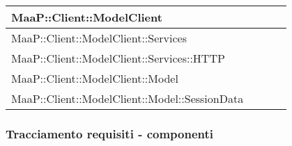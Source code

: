 \begin{center}
\begin{longtable}{|p{0.8\linewidth}|c|}
\midrule 
MaaP::Client::ModelClient
& \\

\midrule 
MaaP::Client::ModelClient::Services
& \\

\midrule 
MaaP::Client::ModelClient::Services::HTTP
& \\

\midrule 
MaaP::Client::ModelClient::Model
& \\

\midrule 
MaaP::Client::ModelClient::Model::SessionData
& \\

\end{longtable}
\end{center}

\subsubsection{Tracciamento requisiti - componenti}
